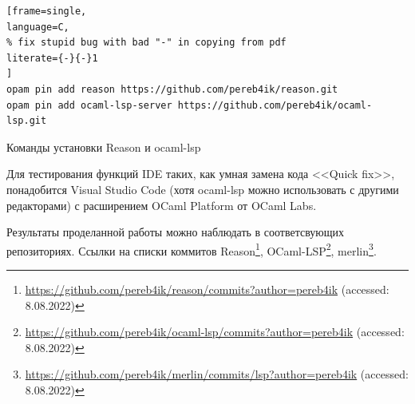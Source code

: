 \lstset{basicstyle=\ttfamily}
\begin{example}
\begin{lstlisting}[frame=single,
language=C,
% fix stupid bug with bad "-" in copying from pdf
literate={-}{-}1
]
opam pin add reason https://github.com/pereb4ik/reason.git
opam pin add ocaml-lsp-server https://github.com/pereb4ik/ocaml-lsp.git
\end{lstlisting}
\caption{Команды установки Reason и ocaml-lsp}
\end{example}
Для тестирования функций IDE таких, как умная замена кода <<Quick fix>>, понадобится Visual Studio Code (хотя ocaml-lsp можно использовать с другими редакторами) с расширением OCaml Platform от OCaml Labs.

Результаты проделанной работы можно наблюдать в соответсвующих репозиториях. Ссылки на списки коммитов Reason\footnote{ \url{https://github.com/pereb4ik/reason/commits?author=pereb4ik} (accessed: 8.08.2022) },
OCaml-LSP\footnote{ \url{https://github.com/pereb4ik/ocaml-lsp/commits?author=pereb4ik} (accessed: 8.08.2022) },
merlin\footnote{ \url{https://github.com/pereb4ik/merlin/commits/lsp?author=pereb4ik} (accessed: 8.08.2022) }.
